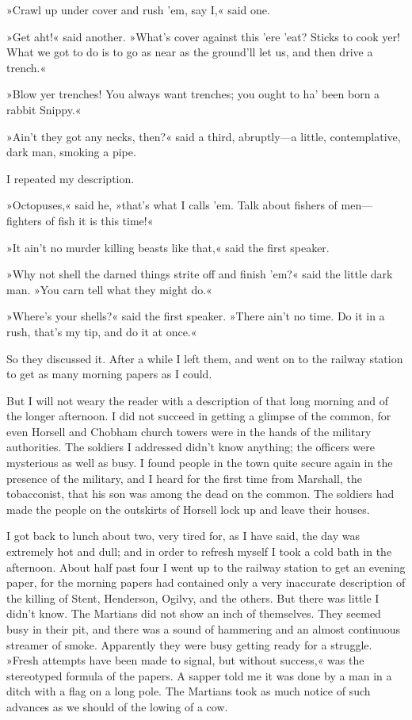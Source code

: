 »Crawl up under cover and rush 'em, say I,« said one.

»Get aht!« said another. »What's cover against this 'ere 'eat? Sticks to cook yer! What we got to do is to go as near as the ground'll let us, and then drive a trench.«

»Blow yer trenches! You always want trenches; you ought to ha' been born a rabbit Snippy.«

»Ain't they got any necks, then?« said a third, abruptly—a little, contemplative, dark man, smoking a pipe.

I repeated my description.

»Octopuses,« said he, »that's what I calls 'em. Talk about fishers of men—fighters of fish it is this time!«

»It ain't no murder killing beasts like that,« said the first speaker.

»Why not shell the darned things strite off and finish 'em?« said the little dark man. »You carn tell what they might do.«

»Where's your shells?« said the first speaker. »There ain't no time. Do it in a rush, that's my tip, and do it at once.«

So they discussed it. After a while I left them, and went on to the railway station to get as many morning papers as I could.

But I will not weary the reader with a description of that long morning and of the longer afternoon. I did not succeed in getting a glimpse of the common, for even Horsell and Chobham church towers were in the hands of the military authorities. The soldiers I addressed didn't know anything; the officers were mysterious as well as busy. I found people in the town quite secure again in the presence of the military, and I heard for the first time from Marshall, the tobacconist, that his son was among the dead on the common. The soldiers had made the people on the outskirts of Horsell lock up and leave their houses.

I got back to lunch about two, very tired for, as I have said, the day was extremely hot and dull; and in order to refresh myself I took a cold bath in the afternoon. About half past four I went up to the railway station to get an evening paper, for the morning papers had contained only a very inaccurate description of the killing of Stent, Henderson, Ogilvy, and the others. But there was little I didn't know. The Martians did not show an inch of themselves. They seemed busy in their pit, and there was a sound of hammering and an almost continuous streamer of smoke. Apparently they were busy getting ready for a struggle. »Fresh attempts have been made to signal, but without success,« was the stereotyped formula of the papers. A sapper told me it was done by a man in a ditch with a flag on a long pole. The Martians took as much notice of such advances as we should of the lowing of a cow.

